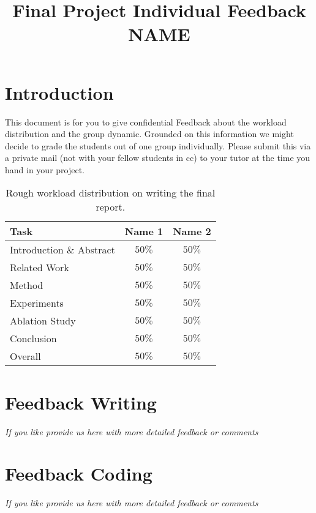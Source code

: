 \documentclass[rebuttal]{cvpr}
\begin{document}
\title{Final Project Individual Feedback NAME}  %

\maketitle
\thispagestyle{empty}


\section{Introduction}
This document is for you to give confidential Feedback about the workload distribution and the group dynamic.
Grounded on this information we might decide to grade the students out of one group individually. 
Please submit this via a private mail (not with your fellow students in cc) to your tutor at the time you hand in your project.

\begin{table}
	\begin{center}
		\begin{tabular}{l|c|c}
			
			Task & Name 1 & Name 2 \\
			\hline
			Introduction \& Abstract & $50\%$ & $50\%$ \\
			Related Work & $50\%$ & $50\%$ \\
			Method & $50\%$ & $50\%$ \\
			Experiments & $50\%$ & $50\%$ \\
			Ablation Study & $50\%$ & $50\%$ \\
			Conclusion & $50\%$ & $50\%$ \\
			\hline
			\hline
			Overall &$50\%$ & $50\%$ \\
			
		\end{tabular}
	\end{center}
	\caption{Rough workload distribution on writing the final report.}
\end{table}


\section{Feedback Writing}
\textit{If you like provide us here with more detailed feedback or comments}

\section{Feedback Coding}
\textit{If you like provide us here with more detailed feedback or comments}
\end{document}
